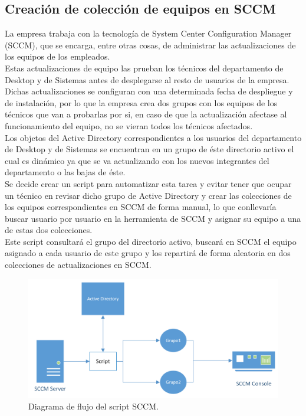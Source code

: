 \documentclass[a4paper, 12pt]{book}
\begin{document}
\subsection{Creación de colección de equipos en SCCM}
\label{Creación de colección de equipos en SCCM}

La empresa trabaja con la tecnología de System Center Configuration Manager (SCCM), que se encarga, entre otras cosas, de administrar las actualizaciones de los equipos de los empleados.
\\

Estas actualizaciones de equipo las prueban los técnicos del departamento de Desktop y de Sistemas antes de desplegarse al resto de usuarios de la empresa. Dichas actualizaciones se configuran con una determinada fecha de despliegue y de instalación, por lo que la empresa crea dos grupos con los equipos de los técnicos que van a probarlas por si, en caso de que la actualización afectase al funcionamiento del equipo, no se vieran todos los técnicos afectados.
\\

Los objetos del Active Directory correspondientes a los usuarios del departamento de Desktop y de Sistemas se encuentran en un grupo de éste directorio activo el cual es dinámico ya que se va actualizando con los nuevos integrantes del departamento o las bajas de éste.
\\

Se decide crear un script para automatizar esta tarea y evitar tener que ocupar un técnico en revisar dicho grupo de Active Directory y crear las colecciones de los equipos correspondientes en SCCM de forma manual, lo que conllevaría buscar usuario por usuario en la herramienta de SCCM y asignar su equipo a una de estas dos colecciones.
\\

Este script consultará el grupo del directorio activo, buscará en SCCM el equipo asignado a cada usuario de este grupo y los repartirá de forma aleatoria en dos colecciones de actualizaciones en SCCM.

\begin{figure}
	\centering
	\includegraphics[width=17cm, keepaspectratio]{img/SCCM_diagrama.png}
	\caption{Diagrama de flujo del script SCCM.}
	\label{fig:SCCM_diagrama}
\end{figure}
\end{document}

